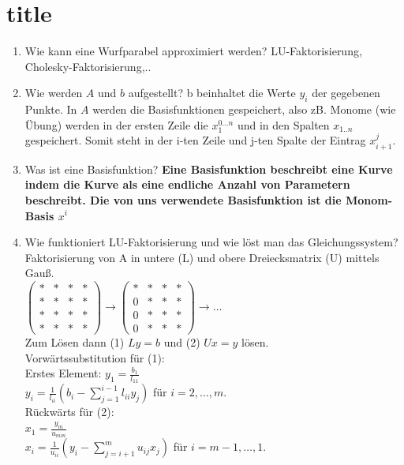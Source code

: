 \documentclass[10pt,a4paper,titlepage]{article}
\newcommand{\luf}{LU-Faktorisierung\xspace}
\newcommand{\chf}{Cholesky-Faktorisierung\xspace}
\begin{document}
	
\section{title}
\begin{enumerate}[series=b]
	\item Wie kann eine Wurfparabel approximiert werden?\newline
	\luf, \chf,..
	\item Wie werden $A$ und $b$ aufgestellt? \newline
	b beinhaltet die Werte $y_i$ der gegebenen Punkte. In $A$ werden die Basisfunktionen gespeichert, also zB. Monome (wie Übung) werden in der ersten Zeile die $x_1^{0...n}$ und in den Spalten $x_{1..n}$ gespeichert. Somit steht in der i-ten Zeile und j-ten Spalte der Eintrag $x_{i+1}^j$.
	\item Was ist eine Basisfunktion? \newline
	\textbf{Eine Basisfunktion beschreibt eine Kurve indem die Kurve als eine endliche Anzahl von Parametern beschreibt. Die von uns verwendete Basisfunktion ist die Monom-Basis $x^i$}
	\item Wie funktioniert \luf und wie löst man das Gleichungssystem? \newline
	      Faktorisierung von A in untere (L) und obere Dreiecksmatrix (U) mittels Gau{\ss}.\\
	      $	
	      \begin{pmatrix}
		* & * & * & *\\
		* & * & * & *\\
		* & * & * & *\\
		* & * & * & *
	      \end{pmatrix}
	      \rightarrow
	      \begin{pmatrix}
		* & * & * & *\\
		0 & * & * & *\\
		0 & * & * & *\\
		0 & * & * & *
	      \end{pmatrix}
	      \rightarrow
              \dots
              $\\
	      Zum Lösen dann (1) $Ly = b$ und (2) $Ux = y$ lösen.\\
	      Vorwärtssubstitution für (1):\\
              Erstes Element: $y_1 = \frac{b_1}{l_{11}}$ \\
	      $ y_i = \frac{1}{l_{ii}} (b_i - \sum_{j=1}^{i-1} l_{ii}y_{j} )$ für $i = 2, \dots, m$.\\
	      Rückwärts für (2): \\
	      $ x_1 = \frac{y_m}{u_{mm}}$ \\
	      $x_i = \frac{1}{u_{ii}} (y_i - \sum_{j=i+1}^{m} u_{ij}x_j)$ für $i = m-1, \dots, 1$. 


\end{enumerate}
\end{document}
